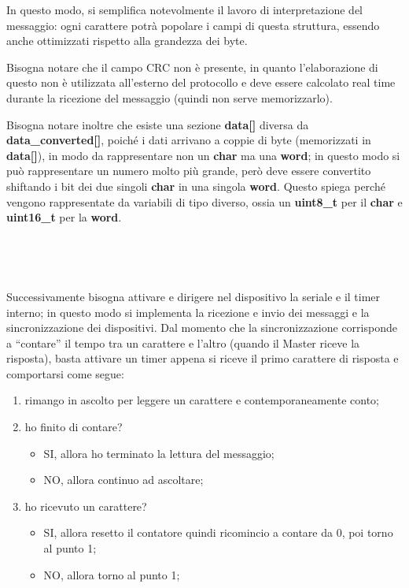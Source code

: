 \documentclass[a4paper,titlepage]{book}
\newcommand{\itema}{\begin{itemize}[noitemsep,topsep=10pt,parsep=5pt,partopsep=10pt]}
\begin{document}
In questo modo, si semplifica notevolmente il lavoro di interpretazione del messaggio: ogni carattere potrà popolare i campi di questa struttura, essendo anche ottimizzati rispetto alla grandezza dei byte. 

Bisogna notare che il campo CRC non è presente, in quanto l'elaborazione di questo non è utilizzata all'esterno del protocollo e deve essere calcolato real time durante la ricezione del messaggio (quindi non serve memorizzarlo).

Bisogna notare inoltre che esiste una sezione \textbf{data[]} diversa da \textbf{data\_converted[]}, poiché i dati arrivano a coppie di byte (memorizzati in \textbf{data[]}), in modo da rappresentare non un \textbf{char} ma una \textbf{word}; in questo modo si può rappresentare un numero molto più grande, però deve essere convertito shiftando i bit dei due singoli \textbf{char} in una singola \textbf{word}. Questo spiega perché vengono rappresentate da variabili di tipo diverso, ossia un \textbf{uint8\_t} per il \textbf{char} e \textbf{uint16\_t} per la \textbf{word}.

~

~

Successivamente bisogna attivare e dirigere nel dispositivo la seriale e il timer interno; in questo modo si implementa la ricezione e invio dei messaggi e la sincronizzazione dei dispositivi. Dal momento che la sincronizzazione corrisponde a ``contare'' il tempo tra un carattere e l'altro (quando il Master riceve la risposta), basta attivare un timer appena si riceve il primo carattere di risposta e comportarsi come segue:

\begin{enumerate}[noitemsep,topsep=15pt,parsep=6pt,partopsep=0pt]

\item rimango in ascolto per leggere un carattere e contemporaneamente conto;
\item ho finito di contare?
	\itema
	\item SI, allora ho terminato la lettura del messaggio;
	\item NO, allora continuo ad ascoltare;
	\end{itemize}
\item ho ricevuto un carattere?
	\itema
	\item SI, allora resetto il contatore quindi ricomincio a contare da 0, poi torno al punto 1;
	\item NO, allora torno al punto 1;
	\end{itemize}

\end{enumerate}
\end{document}
